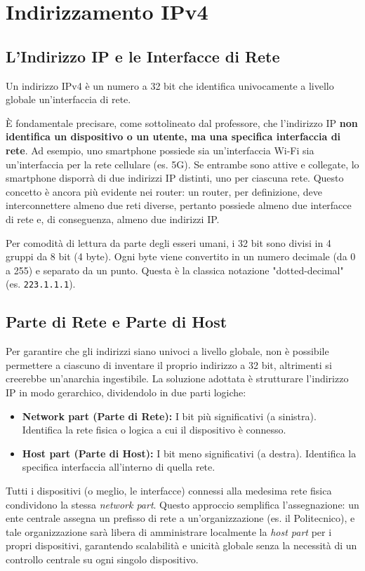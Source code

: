 \section{Indirizzamento IPv4}

\subsection{L'Indirizzo IP e le Interfacce di Rete}
Un indirizzo IPv4 è un numero a 32 bit che identifica univocamente a livello globale un'interfaccia di rete. 

È fondamentale precisare, come sottolineato dal professore, che l'indirizzo IP \textbf{non identifica un dispositivo o un utente, ma una specifica interfaccia di rete}. Ad esempio, uno smartphone possiede sia un'interfaccia Wi-Fi sia un'interfaccia per la rete cellulare (es. 5G). Se entrambe sono attive e collegate, lo smartphone disporrà di due indirizzi IP distinti, uno per ciascuna rete. 
Questo concetto è ancora più evidente nei router: un router, per definizione, deve interconnettere almeno due reti diverse, pertanto possiede almeno due interfacce di rete e, di conseguenza, almeno due indirizzi IP.

Per comodità di lettura da parte degli esseri umani, i 32 bit sono divisi in 4 gruppi da 8 bit (4 byte). Ogni byte viene convertito in un numero decimale (da 0 a 255) e separato da un punto. Questa è la classica notazione "dotted-decimal" (es. \texttt{223.1.1.1}).

\subsection{Parte di Rete e Parte di Host}
Per garantire che gli indirizzi siano univoci a livello globale, non è possibile permettere a ciascuno di inventare il proprio indirizzo a 32 bit, altrimenti si creerebbe un'anarchia ingestibile. La soluzione adottata è strutturare l'indirizzo IP in modo gerarchico, dividendolo in due parti logiche:
\begin{itemize}
    \item \textbf{Network part (Parte di Rete):} I bit più significativi (a sinistra). Identifica la rete fisica o logica a cui il dispositivo è connesso.
    \item \textbf{Host part (Parte di Host):} I bit meno significativi (a destra). Identifica la specifica interfaccia all'interno di quella rete.
\end{itemize}

Tutti i dispositivi (o meglio, le interfacce) connessi alla medesima rete fisica condividono la stessa \emph{network part}. Questo approccio semplifica l'assegnazione: un ente centrale assegna un prefisso di rete a un'organizzazione (es. il Politecnico), e tale organizzazione sarà libera di amministrare localmente la \emph{host part} per i propri dispositivi, garantendo scalabilità e unicità globale senza la necessità di un controllo centrale su ogni singolo dispositivo.

